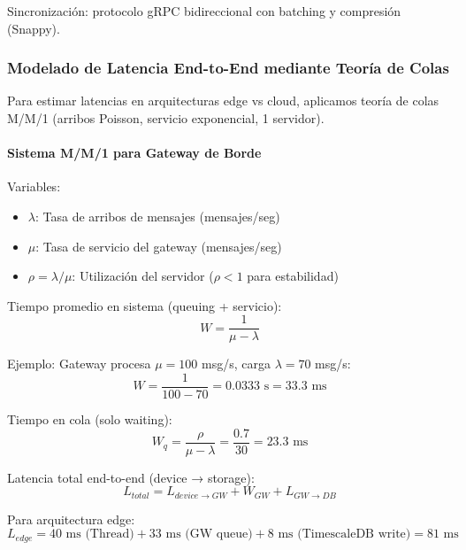 Sincronización: protocolo gRPC bidireccional con batching y compresión (Snappy).

\subsubsection{Modelado de Latencia End-to-End mediante Teoría de Colas}

Para estimar latencias en arquitecturas edge vs cloud, aplicamos teoría de colas M/M/1 (arribos Poisson, servicio exponencial, 1 servidor).

\paragraph{Sistema M/M/1 para Gateway de Borde}

Variables:
\begin{itemize}
\item $\lambda$: Tasa de arribos de mensajes (mensajes/seg)
\item $\mu$: Tasa de servicio del gateway (mensajes/seg)
\item $\rho = \lambda / \mu$: Utilización del servidor ($\rho < 1$ para estabilidad)
\end{itemize}

Tiempo promedio en sistema (queuing + servicio):
\begin{equation}
W = \frac{1}{\mu - \lambda}
\end{equation}

Ejemplo: Gateway procesa $\mu = 100$ msg/s, carga $\lambda = 70$ msg/s:
\begin{equation}
W = \frac{1}{100 - 70} = 0.0333 \text{ s} = 33.3 \text{ ms}
\end{equation}

Tiempo en cola (solo waiting):
\begin{equation}
W_q = \frac{\rho}{\mu - \lambda} = \frac{0.7}{30} = 23.3 \text{ ms}
\end{equation}

Latencia total end-to-end (device → storage):
\begin{equation}
L_{total} = L_{device \rightarrow GW} + W_{GW} + L_{GW \rightarrow DB}
\end{equation}

Para arquitectura edge:
\begin{equation}
L_{edge} = 40 \text{ ms (Thread)} + 33 \text{ ms (GW queue)} + 8 \text{ ms (TimescaleDB write)} = 81 \text{ ms}
\end{equation}

